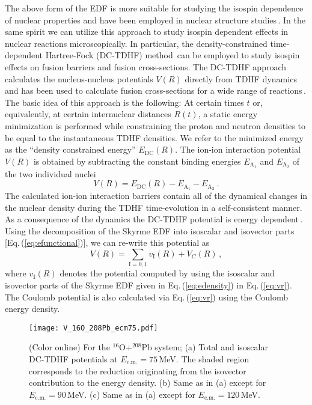 \documentclass[aps,prl,twocolumn,superscriptaddress,floatfix,10pt]{revtex4-1}
\begin{document}
The above form of the EDF is more suitable for studying the isospin dependence
of nuclear properties and have been employed in nuclear structure studies\,\cite{dobaczewski1995}.
In the same spirit we can utilize this approach to study isospin dependent effects in nuclear
reactions microscopically.
In particular, the density-constrained time-dependent Hartree-Fock (DC-TDHF) method\,\cite{umar2006b} can be
employed to study isospin effects on fusion barriers and fusion cross-sections.
The DC-TDHF approach calculates the nucleus-nucleus potentials $V(R)$ directly
from  TDHF dynamics and has been used to calculate fusion cross-sections for a wide range of
reactions\,\cite{umar2014a,simenel2013a,umar2012a,umar2006a,oberacker2010,umar2009a,jiang2015a}.
The basic idea of this approach is the following:
At certain times $t$ or, equivalently, at certain internuclear distances
$R(t)$, a static energy minimization
is performed while constraining the proton and neutron densities to be equal to the instantaneous
TDHF densities.
We refer to the minimized energy as the ``density constrained energy''
$E_{\mathrm{DC}}(R)$.
The ion-ion interaction potential $V(R)$ is obtained by
subtracting the constant binding energies
$E_{\mathrm{A_{1}}}$ and $E_{\mathrm{A_{2}}}$ of the two individual nuclei
\begin{equation}
V(R)=E_{\mathrm{DC}}(R)-E_{\mathrm{A_{1}}}-E_{\mathrm{A_{2}}}\ .
\label{eq:vr}
\end{equation}
The calculated ion-ion interaction barriers contain all of the dynamical changes in the nuclear
density during the TDHF time-evolution in a self-consistent manner.
As a consequence of the dynamics the DC-TDHF potential is energy dependent\,\cite{umar2014a}.
Using the decomposition of the Skyrme EDF into isoscalar and isovector parts [Eq.\,(\ref{eq:efunctional})],
we can re-write this potential as
\begin{equation}
V(R) = \sum_{\mathrm{I}=0,1} v_\mathrm{I}(R) + V_C(R)\,,
\end{equation}
where $v_\mathrm{I}(R)$ denotes the potential computed by using the isoscalar and isovector parts of
the Skyrme EDF given in Eq.\,(\ref{eq:edensity}) in Eq.\,(\ref{eq:vr}).
The Coulomb potential is also calculated via Eq.\,(\ref{eq:vr}) using the Coulomb energy
density.
\begin{figure}[!htb]
\texttt{[image: V\_16O\_208Pb\_ecm75.pdf]}
\caption{(Color online) For the $^{16}$O+$^{208}$Pb system;
	(a) Total and isoscalar DC-TDHF potentials at $E_\mathrm{c.m.}=75$\,MeV. The shaded
    region corresponds to the reduction originating from the isovector contribution to
    the energy density.
    (b) Same as in (a) except for $E_\mathrm{c.m.}=90$\,MeV.
       (c) Same as in (a) except for $E_\mathrm{c.m.}=120$\,MeV.}
\label{fig:OPb}
\end{figure}
\end{document}

